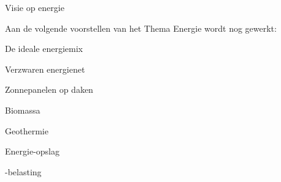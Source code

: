 
\begin{visie-concept}{Visie op energie}\end{visie-concept}

Aan de volgende voorstellen van het Thema Energie wordt nog gewerkt:

\begin{voorstel-concept}{De ideale energiemix}\end{voorstel-concept}
\begin{voorstel-concept}{Verzwaren energienet}\end{voorstel-concept}
\begin{voorstel-concept}{Zonnepanelen op daken}\end{voorstel-concept}
\begin{voorstel-concept}{Biomassa}\end{voorstel-concept}
\begin{voorstel-concept}{Geothermie}\end{voorstel-concept}
\begin{voorstel-concept}{Energie-opslag}\end{voorstel-concept}
\begin{voorstel-concept}{\COO-belasting}\end{voorstel-concept}




% 


% 


% 
% 
